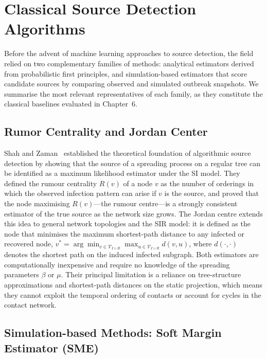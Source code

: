 \section{Classical Source Detection Algorithms}
\label{st:section3}

Before the advent of machine learning approaches to source detection, the field relied on two complementary families of methods: analytical estimators derived from probabilistic first principles, and simulation-based estimators that score candidate sources by comparing observed and simulated outbreak snapshots. We summarise the most relevant representatives of each family, as they constitute the classical baselines evaluated in Chapter~6.

\subsection{Rumor Centrality and Jordan Center}

Shah and Zaman~\cite{Shah2011} established the theoretical foundation of algorithmic source detection by showing that the source of a spreading process on a regular tree can be identified as a maximum likelihood estimator under the SI model. They defined the rumour centrality $R(v)$ of a node $v$ as the number of orderings in which the observed infection pattern can arise if $v$ is the source, and proved that the node maximising $R(v)$---the rumour centre---is a strongly consistent estimator of the true source as the network size grows. The Jordan centre extends this idea to general network topologies and the SIR model: it is defined as the node that minimises the maximum shortest-path distance to any infected or recovered node, $v^* = \arg\min_{v \in \mathcal{V}_{I \cup R}} \max_{u \in \mathcal{V}_{I \cup R}} d(v, u)$, where $d(\cdot, \cdot)$ denotes the shortest path on the induced infected subgraph. Both estimators are computationally inexpensive and require no knowledge of the spreading parameters $\beta$ or $\mu$. Their principal limitation is a reliance on tree-structure approximations and shortest-path distances on the static projection, which means they cannot exploit the temporal ordering of contacts or account for cycles in the contact network.

\subsection{Simulation-based Methods: Soft Margin Estimator (SME)}

